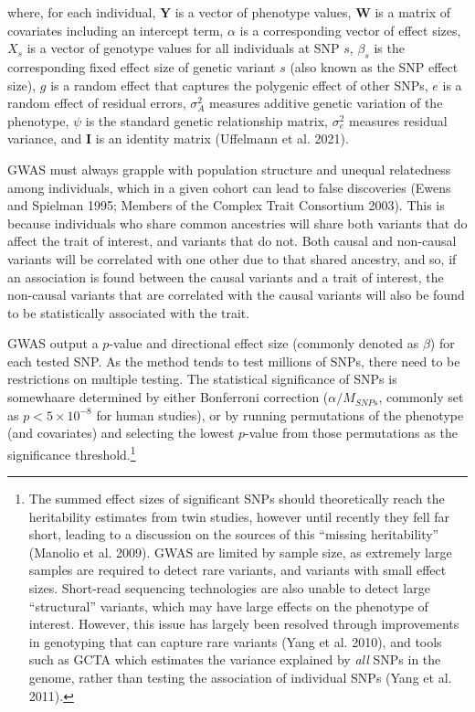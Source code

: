 \documentclass[
]{book}
\begin{document}
where, for each individual, \(\textbf{Y}\) is a vector of phenotype values, \(\textbf{W}\) is a matrix of covariates including an intercept term, \(\alpha\) is a corresponding vector of effect sizes, \(X_s\) is a vector of genotype values for all individuals at SNP \(s\), \(\beta_s\) is the corresponding fixed effect size of genetic variant \(s\) (also known as the SNP effect size), \(g\) is a random effect that captures the polygenic effect of other SNPs, \(e\) is a random effect of residual errors, \(\sigma^2_{A}\) measures additive genetic variation of the phenotype, \(\psi\) is the standard genetic relationship matrix, \(\sigma^2_e\) measures residual variance, and \(\textbf{I}\) is an identity matrix (Uffelmann et al. 2021).

GWAS must always grapple with population structure and unequal relatedness among individuals, which in a given cohort can lead to false discoveries (Ewens and Spielman 1995; Members of the Complex Trait Consortium 2003). This is because individuals who share common ancestries will share both variants that do affect the trait of interest, and variants that do not. Both causal and non-causal variants will be correlated with one other due to that shared ancestry, and so, if an association is found between the causal variants and a trait of interest, the non-causal variants that are correlated with the causal variants will also be found to be statistically associated with the trait.

GWAS output a \(p\)-value and directional effect size (commonly denoted as \(\beta\)) for each tested SNP. As the method tends to test millions of SNPs, there need to be restrictions on multiple testing. The statistical significance of SNPs is somewhaare determined by either Bonferroni correction (\(\alpha / M_{SNPs}\), commonly set as \(p < 5 \times 10^{-8}\) for human studies), or by running permutations of the phenotype (and covariates) and selecting the lowest \(p\)-value from those permutations as the significance threshold.\footnote{The summed effect sizes of significant SNPs should theoretically reach the heritability estimates from twin studies, however until recently they fell far short, leading to a discussion on the sources of this ``missing heritability'' (Manolio et al. 2009). GWAS are limited by sample size, as extremely large samples are required to detect rare variants, and variants with small effect sizes. Short-read sequencing technologies are also unable to detect large ``structural'' variants, which may have large effects on the phenotype of interest. However, this issue has largely been resolved through improvements in genotyping that can capture rare variants (Yang et al. 2010), and tools such as GCTA which estimates the variance explained by \emph{all} SNPs in the genome, rather than testing the association of individual SNPs (Yang et al. 2011).}
\end{document}
